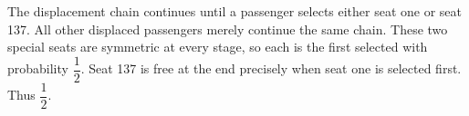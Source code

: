 The displacement chain continues until a passenger selects either seat one or seat 137. All other displaced passengers merely continue the same chain. These two special seats are symmetric at every stage, so each is the first selected with probability $\dfrac{1}{2}$. Seat 137 is free at the end precisely when seat one is selected first. Thus $\boxed{\dfrac{1}{2}}$.
